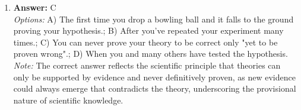 \documentclass[12pt]{article}
\begin{document}
\begin{enumerate}[label=\arabic*.]
\\ \textit{Note:} A is correct because it accurately reflects a fundamental principle in astronomy, while D is true due to its alignment with established astronomical theories or observations, demonstrating a comprehensive understanding of the subject.
\item \textbf{Answer:} C
\\ \textit{Options:} A) The first time you drop a bowling ball and it falls to the ground proving your hypothesis.; B) After you've repeated your experiment many times.; C) You can never prove your theory to be correct only "yet to be proven wrong".; D) When you and many others have tested the hypothesis.
\\ \textit{Note:} The correct answer reflects the scientific principle that theories can only be supported by evidence and never definitively proven, as new evidence could always emerge that contradicts the theory, underscoring the provisional nature of scientific knowledge.
\end{enumerate}
\end{document}
